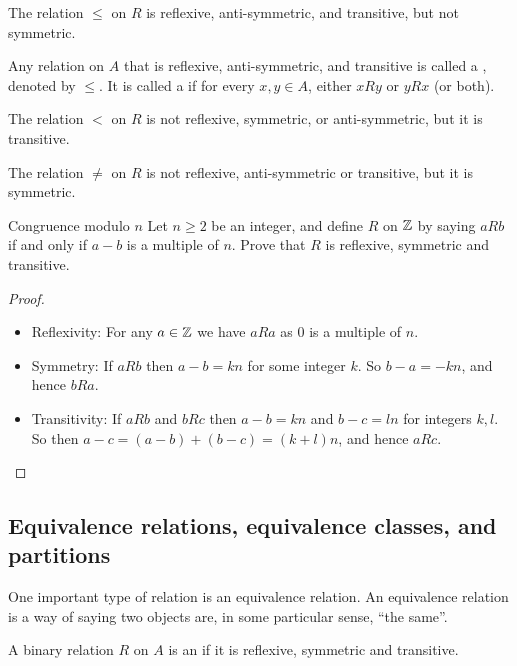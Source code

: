 \begin{example}
The relation $\le$ on $R$ is reflexive, anti-symmetric, and transitive, but not symmetric. 
\end{example}

\begin{definition}
Any relation on $A$ that is reflexive, anti-symmetric, and transitive is called a , denoted by $\le$. It is called a  if for every $x, y \in A$, either $xRy$ or $yRx$ (or both).
\end{definition}

\begin{example}
The relation $<$ on $R$ is not reflexive, symmetric, or anti-symmetric, but it is transitive.
\end{example}

\begin{example}
The relation $\neq$ on $R$ is not reflexive, anti-symmetric or transitive, but it is symmetric.
\end{example}

\begin{exercise}{Congruence modulo $n$}{}
Let $n \ge 2$ be an integer, and define $R$ on $\mathbb Z$ by saying $aRb$ if and only if $a-b$ is a multiple of $n$. Prove that $R$ is reflexive, symmetric and transitive.
\end{exercise}
\begin{proof} \
\begin{itemize}
\item Reflexivity: For any $a \in \mathbb Z$ we have $aRa$ as 0 is a multiple of $n$.
\item Symmetry: If $aRb$ then $a-b=kn$ for some integer $k$. So $b-a=-kn$, and hence $bRa$.
\item Transitivity: If $aRb$ and $bRc$ then $a-b=kn$ and $b-c=ln$ for integers $k,l$. So then $a-c=(a-b)+(b-c)=(k+l)n$, and hence $aRc$.
\end{itemize}
\end{proof}
\pagebreak

\subsection{Equivalence relations, equivalence classes, and partitions}
One important type of relation is an equivalence relation. An equivalence relation is a way of saying two objects are, in some particular sense, ``the same''.

\begin{definition}
A binary relation $R$ on $A$ is an  if it is reflexive, symmetric and transitive.
\end{definition}


